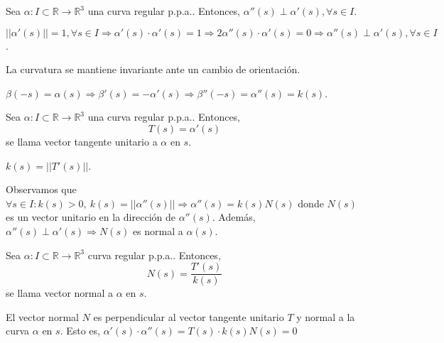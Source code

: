 \begin{prop}
  Sea $\alpha  : I \subset \mathbb{R} \to \mathbb{R}^{3}$ una curva regular p.p.a.. Entonces, $\alpha''(s) \perp \alpha'(s), \forall s \in I$.
\end{prop}

\begin{dem}
  $||\alpha'(s)|| = 1, \forall s \in I \Rightarrow \alpha'(s) \cdot \alpha'(s) = 1 \Rightarrow 2 \alpha''(s) \cdot \alpha'(s) = 0 \Rightarrow \alpha''(s) \perp \alpha'(s), \forall s \in I$.
\end{dem}

\begin{prop}
  La curvatura se mantiene invariante ante un cambio de orientación. 
\end{prop}

\begin{dem}
  $\beta(-s) = \alpha(s) \Rightarrow \beta'(s) = -\alpha'(s) \Rightarrow \beta''(-s) = \alpha''(s) = k(s)$. 
\end{dem}

\begin{defn}
  Sea $\alpha  : I \subset \mathbb{R} \to \mathbb{R}^{3}$ una curva regular p.p.a.. Entonces,
  \[
    T(s) = \alpha'(s) \]
  se llama vector tangente unitario a $\alpha$ en $s$.
\end{defn}

\begin{obs}
  $k(s) = ||T'(s)||$.
\end{obs}

\begin{note}
  Observamos que $\forall s \in I: k(s) > 0, \ k(s) = ||\alpha''(s)|| \Rightarrow \alpha''(s) = k(s) N(s)$ donde $N(s)$ es un vector unitario en la dirección de $\alpha''(s)$. Además, $\alpha''(s) \perp \alpha'(s) \Rightarrow N(s)$ es normal a $\alpha(s)$.
\end{note}

\begin{defn}
  Sea $\alpha  : I \subset \mathbb{R} \to \mathbb{R}^{3}$ curva regular p.p.a.. Entonces, 
  \[ 
    N(s) = \frac{T'(s)}{k(s)} 
  \] 
  se llama vector normal a $\alpha$ en $s$.
\end{defn}

\begin{obs}
  El vector normal $N$ es perpendicular al vector tangente unitario $T$ y normal a la curva $\alpha$ en $s$. Esto es, $\alpha'(s) \cdot \alpha''(s) = T(s) \cdot k(s)N(s) = 0$
\end{obs}

